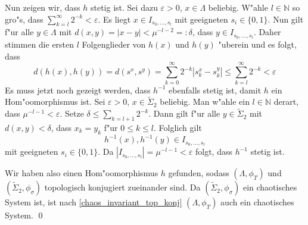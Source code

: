 \documentclass[a4paper, 13pt]{scrreprt}
\theoremstyle{definition} \newtheorem{definition}{Definition}[section]
\newenvironment{beweis}[1][Beweis]{\begin{trivlist}
\item[\hskip \labelsep {\bfseries #1}]}{\end{trivlist}}
\begin{document}
\begin{beweis}
Nun zeigen wir, dass $h$ stetig ist. Sei dazu $\varepsilon > 0$, $x\in\Lambda$ beliebig. W"ahle $l\in\mathbb{N}$ so gro"s, dass $\sum_{k=l}^{\infty}{2^{-k}} < \varepsilon$. Es liegt $x\in I_{s_0,\ldots,s_l}$ mit geeigneten $s_i \in \{0,1\}$. Nun gilt f"ur alle $y \in \Lambda$ mit $d(x, y) = |x- y| < \mu^{-l-2} =: \delta$, dass $y \in I_{s_0, \ldots, s_l}$. Daher stimmen die ersten $l$ Folgenglieder von $h(x)$ und $h(y)$ "uberein und es folgt, dass
$$ d(h(x), h(y)) = d(s^x, s^y) = \sum_{k=0}^{\infty}{2^{-k}|s^x_k - s^y_k|} \leq \sum_{k=l}^{\infty}{2^{-k}} < \varepsilon$$
Es muss jetzt noch gezeigt werden, dass $h^{-1}$ ebenfalls stetig ist, damit $h$ ein Hom"oomorphismus ist. Sei $\varepsilon > 0$, $x \in \tilde\Sigma_2$ beliebig. Man w"ahle ein $l \in \mathbb{N}$ derart, dass $\mu^{-l-1} < \varepsilon$. Setze $\delta \leq \sum_{k=l+1}{2^{-k}}$. Dann gilt f"ur alle $y\in\tilde\Sigma_2$ mit $d(x,y) < \delta$, dass $x_k = y_k$ f"ur $0\leq k\leq l$.
Folglich gilt 
$$h^{-1}(x),  h^{-1}(y) \in I_{s_0, \ldots, s_l}$$
mit geeigneten $s_i \in \{0,1\}$. Da $|I_{s_0, \ldots, s_l}| = \mu^{-l-1} < \varepsilon$ folgt, dass $h^{-1}$ stetig ist.

Wir haben also einen Hom"oomorphismus $h$ gefunden, sodass $(\Lambda, \phi_T)$ und $(\tilde\Sigma_2, \phi_\sigma)$ topologisch konjugiert zueinander sind. Da $(\tilde\Sigma_2, \phi_\sigma)$ ein chaotisches System ist, ist nach \eqref{chaos_invariant_top_konj} $(\Lambda, \phi_T)$ auch ein chaotisches System. 
\qed
\end{beweis}
\end{document}
